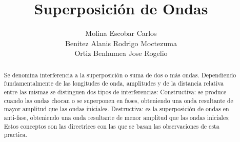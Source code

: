 \documentclass[11pt]{article}
\title{Superposición de Ondas}
\author{Molina Escobar Carlos\\Benitez Alanis Rodrigo Moctezuma\\Ortiz Benhumea Jose Rogelio}
\date{}
\begin{document}
\maketitle

\begin{abstract}
 Se denomina interferencia a la superposición o suma de dos o más ondas. Dependiendo fundamentalmente de las longitudes de onda, amplitudes y de la distancia relativa entre las mismas se distinguen dos tipos de interferencias: 
Constructiva: se produce cuando las ondas chocan o se superponen en fases, obteniendo una onda resultante de mayor amplitud que las ondas iniciales.
 Destructiva: es la superposición de ondas en anti-fase, obteniendo una onda resultante de menor amplitud que las ondas iniciales; Estos conceptos son las directrices con las que se basan las observaciones de esta practica.
\end{abstract}
\end{document}
